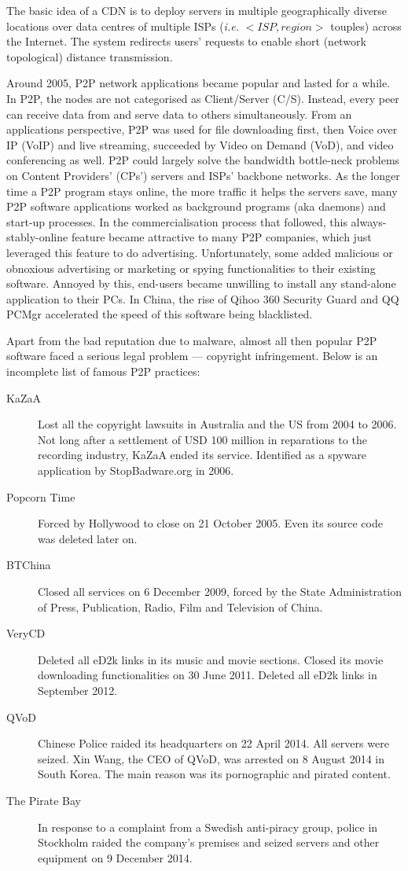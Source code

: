 The basic idea of a CDN is to deploy servers in multiple geographically diverse locations over data centres of multiple ISPs ({\em i.e.} $<ISP, region>$ touples) across the Internet. The system redirects users' requests to enable short (network topological) distance transmission. 

Around 2005, P2P network applications became popular and lasted for a while. In P2P, the nodes are not categorised as Client/Server (C/S). Instead, every peer can receive data from and serve data to others simultaneously. From an applications perspective, P2P was used for file downloading first, then Voice over IP (VoIP) and live streaming, succeeded by Video on Demand (VoD), and video conferencing as well. P2P could largely solve the bandwidth bottle-neck problems on Content Providers' (CPs') servers and ISPs' backbone networks. As the longer time a P2P program stays online, the more traffic it helps the servers save, many P2P software applications worked as background programs (aka daemons) and start-up processes. In the commercialisation process that followed, this always-stably-online feature became attractive to many P2P companies, which just leveraged this feature to do advertising. Unfortunately, some added malicious or obnoxious advertising or marketing or spying functionalities to their existing software. Annoyed by this, end-users became unwilling to install any stand-alone application to their PCs. In China, the rise of Qihoo 360 Security Guard and QQ PCMgr accelerated the speed of this software being blacklisted. 

Apart from the bad reputation due to malware, almost all then popular P2P software faced a serious legal problem --- copyright infringement. Below is an incomplete list of famous P2P practices:  
\begin{description}
	\item[KaZaA] Lost all the copyright lawsuits in Australia and the US from 2004 to 2006. Not long after a settlement of USD 100 million in reparations to the recording industry, KaZaA ended its service. Identified as a spyware application by StopBadware.org in 2006.  
	\item[Popcorn Time] Forced by Hollywood to close on 21 October 2005. Even its source code was deleted later on. 
	\item[BTChina] Closed all services on 6 December 2009, forced by the State Administration of Press, Publication, Radio, Film and Television of China. 
	\item[VeryCD] Deleted all eD2k links in its music and movie sections. Closed its movie downloading functionalities on 30 June 2011. Deleted all eD2k links in September 2012. 
	\item[QVoD] Chinese Police raided its headquarters on 22 April 2014. All servers were seized. Xin Wang, the CEO of QVoD, was arrested on 8 August 2014 in South Korea. The main reason was its pornographic and pirated content. 
	\item[The Pirate Bay] In response to a complaint from a Swedish anti-piracy group, police in Stockholm raided the company's premises and seized servers and other equipment on 9 December 2014. 
\end{description}

